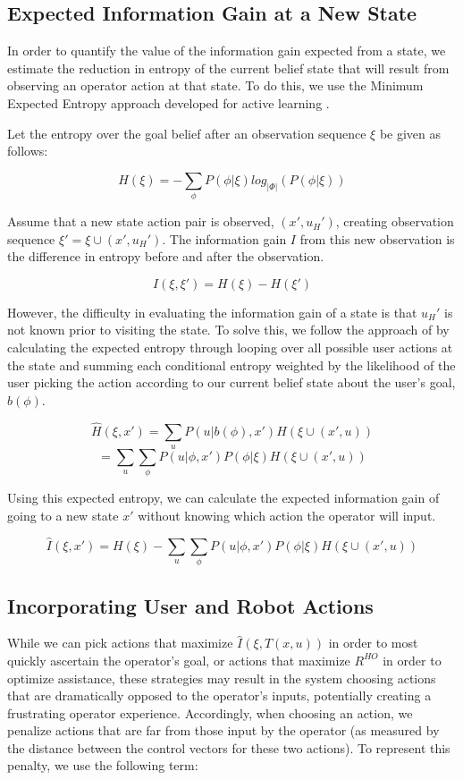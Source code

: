 \documentclass[conference]{IEEEtran}
\begin{document}
\subsection{Expected Information Gain at a New State}

In order to quantify the value of the information gain expected from a state, we estimate the reduction in entropy of the current belief state that will result from observing an operator action at that state. To do this, we use the Minimum Expected Entropy approach developed for active learning \cite{holub2008entropy}.

Let the entropy over the goal belief after an observation sequence $\xi$ be given as follows:

\[
H(\xi) = -\sum_\phi P(\phi|\xi)log_{|\Phi|}(P(\phi|\xi))
\]

Assume that a new state action pair is observed, $(x',u_H')$, creating observation sequence $\xi' = \xi \cup (x', u_H')$. The information gain $I$ from this new observation is the difference in entropy before and after the observation.

\[
I(\xi, \xi') = H(\xi) - H(\xi')
\]

However, the difficulty in evaluating the information gain of a state is that $u_H'$ is not known prior to visiting the state. To solve this, we follow the approach of \citet{holub2008entropy} by calculating the expected entropy through looping over all possible user actions at the state and summing each conditional entropy weighted by the likelihood of the user picking the action according to our current belief state about the user's goal, $b(\phi)$.

\[
\hat{H}(\xi, x') = \sum_u P(u|b(\phi),x')H(\xi \cup (x', u))
\]
\[
= \sum_u \sum_\phi P(u|\phi,x')P(\phi|\xi)H(\xi \cup (x', u))
\]

Using this expected entropy, we can calculate the expected information gain of going to a new state $x'$ without knowing which action the operator will input.

\[
\hat{I}(\xi, x') = H(\xi) - \sum_u \sum_\phi P(u|\phi,x')P(\phi|\xi)H(\xi \cup (x', u))
\]

\subsection{Incorporating User and Robot Actions}
While we can pick actions that maximize $\hat{I}(\xi, T(x,u))$ in order to most quickly ascertain the operator's goal, or actions that maximize $R^{HO}$ in order to optimize assistance, these strategies may result in the system choosing actions that are dramatically opposed to the operator's inputs, potentially creating a frustrating operator experience. Accordingly, when choosing an action, we penalize actions that are far from those input by the operator (as measured by the distance between the control vectors for these two actions). To represent this penalty, we use the following term:
\end{document}
